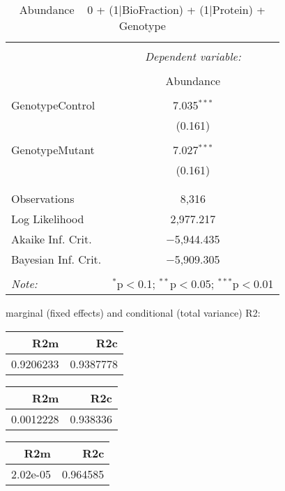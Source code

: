 \documentclass[11pt]{report}
\begin{document}
\begin{table}[!htbp] \centering 
  \caption{Abundance ~ 0 + (1|BioFraction) + (1|Protein) + Genotype} 
  \label{} 
\begin{tabular}{@{\extracolsep{5pt}}lc} 
\\[-1.8ex]\hline 
\hline \\[-1.8ex] 
 & \multicolumn{1}{c}{\textit{Dependent variable:}} \\ 
\cline{2-2} 
\\[-1.8ex] & Abundance \\ 
\hline \\[-1.8ex] 
 GenotypeControl & 7.035$^{***}$ \\ 
  & (0.161) \\ 
  & \\ 
 GenotypeMutant & 7.027$^{***}$ \\ 
  & (0.161) \\ 
  & \\ 
\hline \\[-1.8ex] 
Observations & 8,316 \\ 
Log Likelihood & 2,977.217 \\ 
Akaike Inf. Crit. & $-$5,944.435 \\ 
Bayesian Inf. Crit. & $-$5,909.305 \\ 
\hline 
\hline \\[-1.8ex] 
\textit{Note:}  & \multicolumn{1}{r}{$^{*}$p$<$0.1; $^{**}$p$<$0.05; $^{***}$p$<$0.01} \\ 
\end{tabular} 
\end{table} 
marginal (fixed effects) and conditional (total variance) R2:

\begin{tabular}{r|r}
\hline
R2m & R2c\\
\hline
0.9206233 & 0.9387778\\
\hline
\end{tabular}

\begin{tabular}{r|r}
\hline
R2m & R2c\\
\hline
0.0012228 & 0.938336\\
\hline
\end{tabular}

\begin{tabular}{r|r}
\hline
R2m & R2c\\
\hline
2.02e-05 & 0.964585\\
\hline
\end{tabular}
\end{document}
